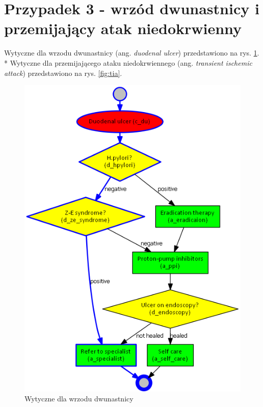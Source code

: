 \section{Przypadek 3 - wrzód dwunastnicy i przemijający atak niedokrwienny}
Wytyczne dla wrzodu dwunastnicy (ang. \textit{duodenal ulcer}) przedstawiono na rys. \ref{fig:du}.\\*
Wytyczne dla przemijającego ataku niedokrwiennego (ang. \textit{transient ischemic attack}) przedstawiono na rys. \ref{fig:tia}.
\begin{figure}[H]
\centering
\includegraphics[scale=0.5]{img/du.png}
\caption{Wytyczne dla wrzodu dwunastnicy}
\label{fig:du}
\end{figure}
\newpage
